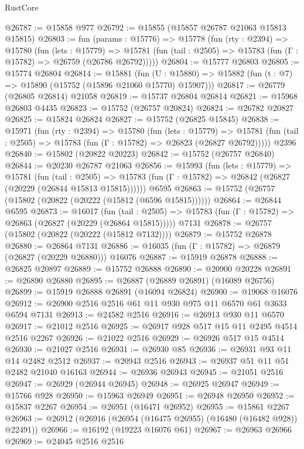 \begin{lexlean}{RustCore}
\begin{coremodule}
@26787 := @15858 @977
@26792 := @15855 (@15857 @26787 @21063 @15813 @15815)
@26803 := fun (params : @15776) =>
  @15778
    (fun (rty : @2394) =>
    @15780
      (fun (lets : @15779) =>
      @15781 (fun (tail : @2505) => @15783 (fun (Γ : @15782) => @26759 (@26786 @26792)))))
@26804 := @15777 @26803
@26805 := @15774 @26804
@26814 := @15881
    (fun (U : @15880) => @15882 (fun (t : @7) => @15890 (@15752 (@15896 @21060 @15770) @15907)))
@26817 := @26779 (@26805 @26814) @21058
@26819 := @15737 @26804 @26814
@26821 := @15968 @26803 @4435
@26823 := @15752 (@26757 @20824)
@26824 := @26782 @20827
@26825 := @15824 @26824
@26827 := @15752 (@26825 @15845)
@26838 := @15971
    (fun (rty : @2394) =>
    @15780
      (fun (lets : @15779) =>
      @15781 (fun (tail : @2505) => @15783 (fun (Γ : @15782) => @26823 (@26827 @26792)))))
    @2396
@26840 := @15802 (@20822 @20223)
@26842 := @15752 (@26757 @26840)
@26844 := @20230 @26787 @21063
@26856 := @15993
    (fun (lets : @15779) =>
    @15781
      (fun (tail : @2505) =>
      @15783 (fun (Γ : @15782) => @26842 (@26827 (@20229 (@26844 @15813 @15815))))))
    @6595
@26863 := @15752 (@26757 (@15802 (@20822 (@20222 (@15812 (@6596 @15815))))))
@26864 := @26844 @6595
@26873 := @16017
    (fun (tail : @2505) => @15783 (fun (Γ : @15782) => @26863 (@26827 (@20229 (@26864 @15815)))))
    @7131
@26878 := @26757 (@15802 (@20822 (@20222 (@15812 @7132))))
@26879 := @15752 @26878
@26880 := @26864 @7131
@26886 := @16035 (fun (Γ : @15782) => @26879 (@26827 (@20229 @26880))) @16076
@26887 := @15919 @26878
@26888 := @26825 @20897
@26889 := @15752 @26888
@26890 := @20900 @20228
@26891 := @26890 @26880
@26895 := @26887 (@26889 @26891) (@16089 @26756)
@26899 := @15919 @26888 @26891 (@16094 @26824)
@26900 := @19068 @16076
@26912 := @26900 @2516 @2516 @61 @11 @930 @975 @11 @6570 @61 @3633 @6594 @7131
@26913 := @24582 @2516
@26916 := @26913 @930 @11 @6570
@26917 := @21012 @2516
@26925 := @26917 @928 @517 @15 @11 @2495 @4514 @2516 @2267
@26926 := @21022 @2516
@26929 := @26926 @517 @15 @4514
@26930 := @21027 @2516
@26931 := @26930 @85
@26936 := @26931 @93 @11 @14 @2482 @2512
@26937 := @20943 @2516
@26943 := @26937 @51 @11 @51 @2482 @21040 @16163
@26944 := @26936 @26943
@26945 := @21051 @2516
@26947 := @26929 (@26944 @26945)
@26948 := @26925 @26947
@26949 := @15766 @928
@26950 := @15963 @26949
@26951 := @26948 @26950
@26952 := @15837 @2267
@26954 := @26951 (@16471 @26952)
@26955 := @15861 @2267
@26963 := @26912 (@26916 (@26954 (@16475 @26955) (@16480 (@16482 @928)) @22491))
@26966 := @16192 (@19223 @16076 @61)
@26967 := @26963 @26966
@26969 := @24045 @2516 @2516

\end{coremodule}
\end{lexlean}
